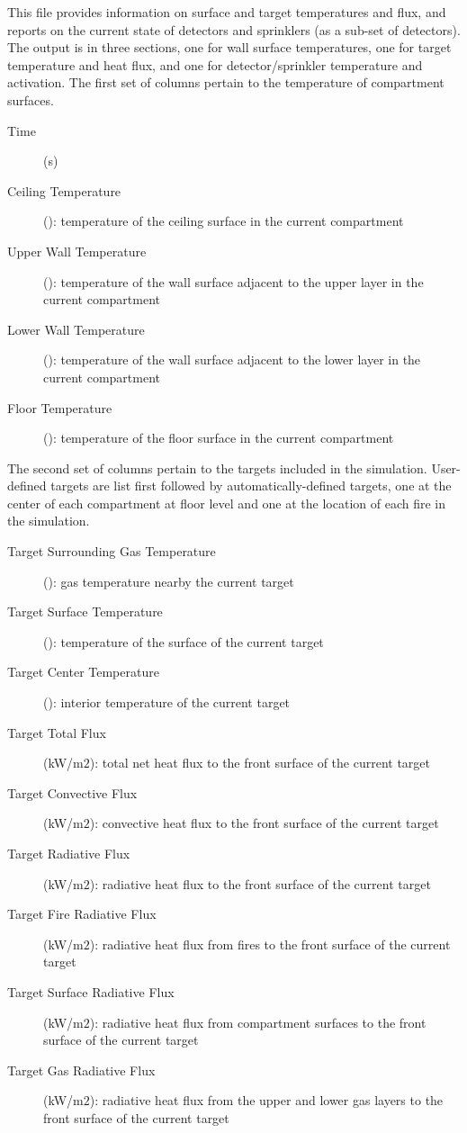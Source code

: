 This file provides information on surface and target temperatures and flux, and reports on the current state of detectors and sprinklers (as a sub-set of detectors). The output is in three sections, one for wall surface temperatures, one for target temperature and heat flux, and one for detector/sprinkler temperature and activation. The first set of columns pertain to the temperature of compartment surfaces.
\begin{description}
\item[Time] (s)
\item[Ceiling Temperature] (\degc): temperature of the ceiling surface in the current compartment
\item[Upper Wall Temperature] (\degc): temperature of the wall surface adjacent to the upper layer in the current compartment
\item[Lower Wall Temperature] (\degc): temperature of the  wall surface adjacent to the lower layer in the current compartment
\item[Floor Temperature] (\degc): temperature of the floor surface in the current compartment
\end{description}
The second set of columns pertain to the targets included in the simulation.  User-defined targets are list first followed by automatically-defined targets, one at the center of each compartment at floor level and one at the location of each fire in the simulation.
\begin{description}
\item[Target Surrounding Gas Temperature] (\degc): gas temperature nearby the current target
\item[Target Surface Temperature] (\degc): temperature of the surface of the current target
\item[Target Center Temperature] (\degc): interior temperature of the current target
\item[Target Total Flux] (kW/m$2$): total net heat flux to the front surface of the current target
\item[Target Convective Flux] (kW/m$2$): convective heat flux to the  front surface of the current target
\item[Target Radiative Flux] (kW/m$2$): radiative heat flux to the front surface of the current target
\item[Target Fire Radiative Flux] (kW/m$2$): radiative heat flux from fires to the front surface of the current target
\item[Target Surface Radiative Flux] (kW/m$2$): radiative heat flux from compartment surfaces to the front surface of the current target
\item[Target Gas Radiative Flux] (kW/m$2$):   radiative heat flux from the upper and lower gas layers to the front surface of the current target
\end{description}
